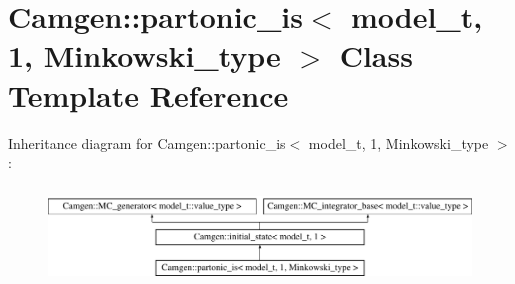 \hypertarget{a00413}{}\section{Camgen\+:\+:partonic\+\_\+is$<$ model\+\_\+t, 1, Minkowski\+\_\+type $>$ Class Template Reference}
\label{a00413}
Inheritance diagram for Camgen\+:\+:partonic\+\_\+is$<$ model\+\_\+t, 1, Minkowski\+\_\+type $>$\+:\begin{figure}[H]
\begin{center}
\leavevmode
\includegraphics[height=2.608696cm]{a00413}
\end{center}
\end{figure}
